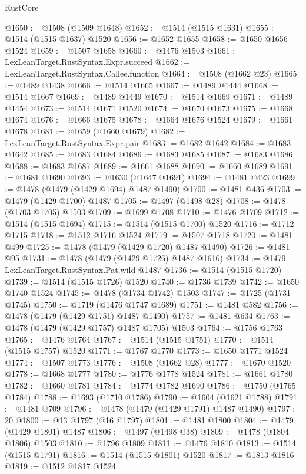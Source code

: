 \begin{lexlean}{RustCore}
\begin{coremodule}
@1650 := @1508 (@1509 @1648)
@1652 := @1514 (@1515 @1631)
@1655 := @1514 (@1515 @1637) @1520
@1656 := @1652 @1655
@1658 := @1650 @1656 @1524
@1659 := @1507 @1658
@1660 := @1476 @1503
@1661 := LexLeanTarget.RustSyntax.Expr.succeed
@1662 := LexLeanTarget.RustSyntax.Callee.function
@1664 := @1508 (@1662 @23)
@1665 := @1489 @1438
@1666 := @1514 @1665
@1667 := @1489 @1444
@1668 := @1514 @1667
@1669 := @1489 @1449
@1670 := @1514 @1669
@1671 := @1489 @1454
@1673 := @1514 @1671 @1520
@1674 := @1670 @1673
@1675 := @1668 @1674
@1676 := @1666 @1675
@1678 := @1664 @1676 @1524
@1679 := @1661 @1678
@1681 := @1659 (@1660 @1679)
@1682 := LexLeanTarget.RustSyntax.Expr.pair
@1683 := @1682 @1642
@1684 := @1683 @1642
@1685 := @1683 @1684
@1686 := @1683 @1685
@1687 := @1683 @1686
@1688 := @1683 @1687
@1689 := @1661 @1688
@1690 := @1660 @1689
@1691 := @1681 @1690
@1693 := @1630 (@1647 @1691)
@1694 := @1481 @423
@1699 := @1478 (@1479 (@1429 @1694) @1487 @1490)
@1700 := @1481 @436
@1703 := @1479 (@1429 @1700) @1487
@1705 := @1497 (@1498 @28)
@1708 := @1478 (@1703 @1705) @1503
@1709 := @1699 @1708
@1710 := @1476 @1709
@1712 := @1514 (@1515 @1694)
@1715 := @1514 (@1515 @1700) @1520
@1716 := @1712 @1715
@1718 := @1512 @1716 @1524
@1719 := @1507 @1718
@1720 := @1481 @499
@1725 := @1478 (@1479 (@1429 @1720) @1487 @1490)
@1726 := @1481 @95
@1731 := @1478 (@1479 (@1429 @1726) @1487 @1616)
@1734 := @1479 LexLeanTarget.RustSyntax.Pat.wild @1487
@1736 := @1514 (@1515 @1720)
@1739 := @1514 (@1515 @1726) @1520
@1740 := @1736 @1739
@1742 := @1650 @1740 @1524
@1745 := @1478 (@1734 @1742) @1503
@1747 := @1725 (@1731 @1745)
@1750 := @1719 (@1476 @1747 @1689)
@1751 := @1481 @582
@1756 := @1478 (@1479 (@1429 @1751) @1487 @1490)
@1757 := @1481 @634
@1763 := @1478 (@1479 (@1429 @1757) @1487 @1705) @1503
@1764 := @1756 @1763
@1765 := @1476 @1764
@1767 := @1514 (@1515 @1751)
@1770 := @1514 (@1515 @1757) @1520
@1771 := @1767 @1770
@1773 := @1650 @1771 @1524
@1774 := @1507 @1773
@1776 := @1508 (@1662 @28)
@1777 := @1670 @1520
@1778 := @1668 @1777
@1780 := @1776 @1778 @1524
@1781 := @1661 @1780
@1782 := @1660 @1781
@1784 := @1774 @1782 @1690
@1786 := @1750 (@1765 @1784)
@1788 := @1693 (@1710 @1786)
@1790 := @1604 (@1621 @1788)
@1791 := @1481 @709
@1796 := @1478 (@1479 (@1429 @1791) @1487 @1490)
@1797 := 20
@1800 := @13 @1797 (@16 @1797)
@1801 := @1481 @1800
@1804 := @1479 (@1429 @1801) @1487
@1806 := @1497 (@1498 @38)
@1809 := @1478 (@1804 @1806) @1503
@1810 := @1796 @1809
@1811 := @1476 @1810
@1813 := @1514 (@1515 @1791)
@1816 := @1514 (@1515 @1801) @1520
@1817 := @1813 @1816
@1819 := @1512 @1817 @1524

\end{coremodule}
\end{lexlean}
